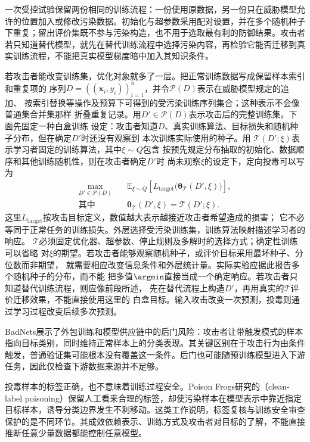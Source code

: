 一次受控试验保留两份相同的训练流程：一份使用原数据，另一份只在威胁模型允许的位置加入或修改污染数据。初始化与超参数采用配对设置，并在多个随机种子下重复；留出评价集既不参与污染构造，也不用于选取最有利的防御结果。攻击者若只知道替代模型，就先在替代训练流程中选择污染内容，再检验它能否迁移到真实训练流程，不能把真实模型梯度暗中加入其知识条件。

若攻击者能改变训练集，优化对象就多了一层。把正常训练数据写成保留样本索引和重复项的
序列$D=((\bm{x}_i,y_i))_{i=1}^{n}$，并令$\mathcal P(D)$表示在威胁模型规定的追加、
按索引替换等操作及预算下可得到的受污染训练序列集合；这种表示不会像普通集合并集那样
折叠重复记录。用$D'\in\mathcal P(D)$表示攻击后的完整训练集。下面先固定一种白盒训练
设定：攻击者知道$D$、真实训练算法、目标损失和随机种子分布，但在确定$D'$时还没有观察到
本次训练实际使用的种子。用
$\mathcal T(D';\xi)$表示学习者固定的训练算法，其中$\xi\sim Q$包含
按预先规定分布抽取的初始化、数据顺序和其他训练随机性，则在攻击者确定$D'$时
尚未观察$\xi$的设定下，定向投毒可以写为
\begin{equation}
 \begin{aligned}
 \max_{D'\in\mathcal P(D)}\quad&
 \mathbb E_{\xi\sim Q}
 \left[L_{\mathrm{target}}\bigl(\bm{\theta}_{\mathcal T}
       (D',\xi)\bigr)\right],\\
 \text{其中}\quad&
 \bm{\theta}_{\mathcal T}(D',\xi)
 =\mathcal T(D';\xi).
 \end{aligned}
 \label{eq:security-poison-bilevel}
\end{equation}
这里$L_{\mathrm{target}}$按攻击目标定义，数值越大表示越接近攻击者希望造成的损害；
它不必等同于正常任务的训练损失。外层选择受污染训练集，训练算法映射描述学习者的响应。
$\mathcal T$必须固定优化器、超参数、停止规则及多解时的选择方式；确定性训练可以省略
对$\xi$的期望。若攻击者能够观察随机种子，或评价目标采用最坏种子、分位数而非期望，
就需要相应改变信息条件和外层统计量。实际实验应据此报告多个随机种子的分布，而不能
把多值$\argmin$直接当成一个确定响应。若攻击者只知道替代训练流程，则应像前段所述，
先在替代流程上构造$D'$，再用真实的$\mathcal T$评价迁移效果，不能直接使用这里的
白盒目标。输入攻击改变一次预测，投毒则通过学习过程改变后续多次预测。

BadNets展示了外包训练和模型供应链中的后门风险：攻击者让带触发模式的样本指向目标类别，同时维持正常样本上的分类表现。其关键区别在于攻击行为由条件触发，普通验证集可能根本没有覆盖这一条件。后门也可能随预训练模型进入下游任务，因此仅检查下游数据来源并不足够。

投毒样本的标签正确，也不意味着训练过程安全。Poison Frogs研究的（clean-label poisoning）保留人工看来合理的标签，却使污染样本在模型表示中靠近指定目标样本，诱导分类边界发生不利移动。这类工作说明，标签复核与训练安全审查保护的是不同环节。其成效依赖表示、训练方式及攻击者对目标的了解，不能直接推断任意少量数据都能控制任意模型。

